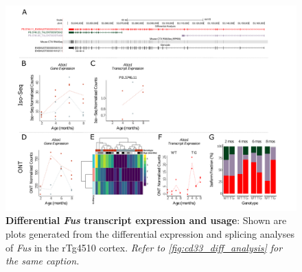 \begin{landscape}
	\begin{figure}[htp]
		\begin{center}
			\includegraphics[page=9,trim={0 0.5cm 0 1.5cm},scale =0.85]{Figures/TargetGene_DifferentialAnalysis.pdf}
		\end{center}
		\captionsetup{width=1.5\textwidth}
		\caption[Differential \textit{Fus} transcript expression and usage]%
		{\textbf{Differential \textit{Fus} transcript expression and usage}: Shown are plots generated from the differential expression and splicing analyses of \textit{Fus} in the rTg4510 cortex. \textit{Refer to \cref{fig:cd33_diff_analysis} for the same caption.}}   
		\label{fig:Fus_diff_analysis}
	\end{figure}
\end{landscape}

